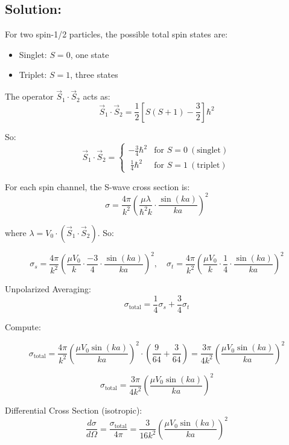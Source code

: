 \documentclass[12pt]{article}
\begin{document}
    \subsection{Solution:}
        For two spin-1/2 particles, the possible total spin states are:
        \begin{itemize}
            \item Singlet: \( S = 0 \), one state
            \item Triplet: \( S = 1 \), three states
        \end{itemize}
    
        The operator \( \vec{S}_1 \cdot \vec{S}_2 \) acts as:
        \[
            \vec{S}_1 \cdot \vec{S}_2 = \frac{1}{2} \left[ S(S+1) - \frac{3}{2} \right] \hbar^2
        \]
    
        So:
        \[
            \vec{S}_1 \cdot \vec{S}_2 =
            \begin{cases}
                -\frac{3}{4} \hbar^2 & \text{for } S = 0 \ (\text{singlet}) \\
                \ \frac{1}{4} \hbar^2 & \text{for } S = 1 \ (\text{triplet})
            \end{cases}
        \]
    
        For each spin channel, the S-wave cross section is:
        \[
            \sigma = \frac{4\pi}{k^2} \left( \frac{\mu \lambda}{\hbar^2 k} \cdot \frac{\sin(ka)}{ka} \right)^2
        \]
    
        where \( \lambda = V_0 \cdot (\vec{S}_1 \cdot \vec{S}_2) \). So:
    
        \[
            \sigma_s = \frac{4\pi}{k^2} \left( \frac{\mu V_0}{k} \cdot \frac{-3}{4} \cdot \frac{\sin(ka)}{ka} \right)^2,
            \quad
            \sigma_t = \frac{4\pi}{k^2} \left( \frac{\mu V_0}{k} \cdot \frac{1}{4} \cdot \frac{\sin(ka)}{ka} \right)^2
        \]
    
        Unpolarized Averaging:
        \[
            \sigma_{\text{total}} = \frac{1}{4} \sigma_s + \frac{3}{4} \sigma_t
        \]
    
        Compute:
    
        \[
            \sigma_{\text{total}} = \frac{4\pi}{k^2} \left( \frac{\mu V_0 \sin(ka)}{k a} \right)^2 \cdot \left( \frac{9}{64} + \frac{3}{64} \right)
            = \frac{3\pi}{4k^2} \left( \frac{\mu V_0 \sin(ka)}{k a} \right)^2
        \]
    
        \[
            \boxed{            \sigma_{\text{total}} = \frac{3\pi}{4k^2} \left( \frac{\mu V_0 \sin(ka)}{k a} \right)^2        }
        \]
    
        Differential Cross Section (isotropic):
        \[
            \boxed{        \frac{d\sigma}{d\Omega} = \frac{\sigma_{\text{total}}}{4\pi} = \frac{3}{16k^2} \left( \frac{\mu V_0 \sin(ka)}{k a} \right)^2        }
        \]
    
\end{document}
